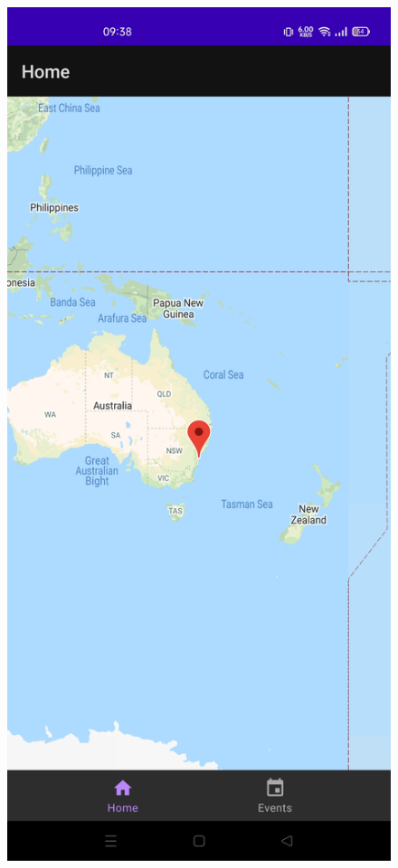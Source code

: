 \documentclass[10pt,xcolor=pdflatex,hyperref={unicode}]{beamer}
\begin{document}
\begin{frame}
\begin{figure}
\begin{minipage}{0.4\textwidth}
        \end{minipage}
        \hfill
        \begin{minipage}{0.4\textwidth}
            \centering
            \includegraphics[width=0.25\paperwidth]{img/ui2.jpg}
        \end{minipage}
        \hfill
    \end{figure}
\end{frame}
\end{document}

